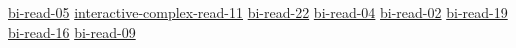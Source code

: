 \hyperref[sec:bi-read-05]{bi-read-05}
\hyperref[sec:interactive-complex-read-11]{interactive-complex-read-11}
\hyperref[sec:bi-read-22]{bi-read-22}
\hyperref[sec:bi-read-04]{bi-read-04}
\hyperref[sec:bi-read-02]{bi-read-02}
\hyperref[sec:bi-read-19]{bi-read-19}
\hyperref[sec:bi-read-16]{bi-read-16}
\hyperref[sec:bi-read-09]{bi-read-09}
